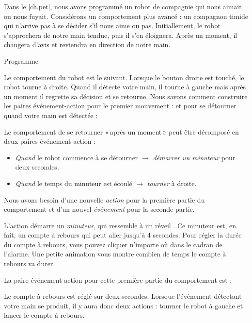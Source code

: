 
Dans le \cref{ch.pet}, nous avons programmé un robot de compagnie qui nous aimait ou nous fuyait.
Considérons un comportement plus avancé : un compagnon timide qui n'arrive pas à se décider s'il nous aime ou pas.
Initiallement, le robot s'approchera de notre main tendue, puis il s'en éloignera.
Après un moment, il changera d'avis et reviendra en direction de notre main.

{\raggedleft \hfill Programme }

Le comportement du robot est le suivant.
Lorsque le bouton droite est touché, le robot tourne à droite.
Quand il détecte votre main, il tourne à gauche mais après un moment il regrette sa décision et se retourne.
Nous savons comment construire les paires événement-action pour le premier mouvement :
 et pour se détourner quand votre main est détectée : 

Le comportement de se retourner «\,après un moment\,» peut être décomposé en deux paires événement-action :
\begin{itemize}

\item \emph{Quand} le robot commence à se détourner $\rightarrow$ \emph{démarrer un minuteur} pour deux secondes.

\item \emph{Quand} le temps du minuteur est écoulé $\rightarrow$ \emph{tourner} à droite.

\end{itemize}

Nous avons besoin d'une nouvelle \emph{action} pour la première partie du comportement et d'un nouvel \emph{événement} pour la seconde partie.

L'action démarre un \emph{minuteur}, qui ressemble à un réveil .
Ce minuteur est, en fait, un compte à rebours qui peut aller jusqu'à 4 secondes.
Pour régler la durée du compte à rebours, vous pouvez cliquer n'importe où dans le cadran de l'alarme.
Une petite animation vous montre combien de temps le compte à rebours va durer.

\newpage

La paire événement-action pour cette première partie du comportement est : 

Le compte à rebours est réglé sur deux secondes.
Lorsque l'événement détectant votre main se produit, il y aura donc deux actions : tourner le robot à gauche et lancer le compte à rebours.

